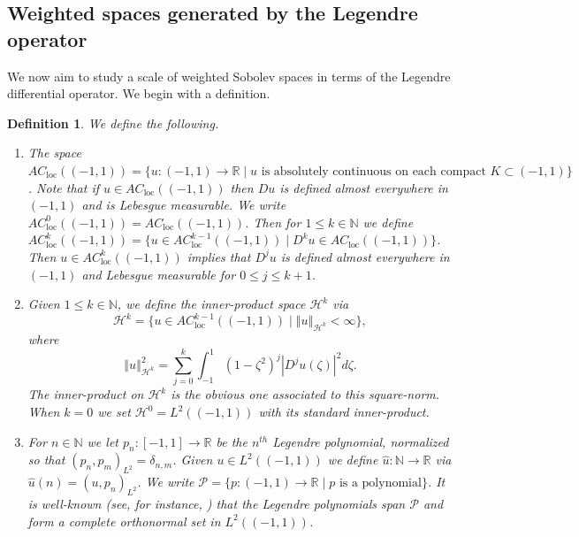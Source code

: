 \documentclass[11pt,reqno]{amsart}
\numberwithin{equation}{section}
\providecommand{\abs}[1]{\left\vert#1\right\vert}
\providecommand{\norm}[1]{\left\Vert#1\right\Vert}
\providecommand{\ip}[1]{\left(#1 \right)}
\providecommand{\abs}[1]{\left\vert#1\right\vert}
\providecommand{\norm}[1]{\left\Vert#1\right\Vert}
\newcommand{\m}{\mathrm}
\def\h{\mathcal{H}}
\def\N{\mathbb{N}}
\def\R{\mathbb{R}}
\def\acl{AC_{\m{loc}}}
\def\st{\;\vert\;}
\newtheorem{dfn}[lem]{Definition}
\begin{document}
\subsection{Weighted spaces generated by the Legendre operator}

We now aim to study a scale of weighted Sobolev spaces in terms of the Legendre differential operator.  We begin with a definition.

\begin{dfn}
We define the following.
\begin{enumerate}
 \item The space $\acl((-1,1))  = \{u : (-1,1) \to \R \st u \text{ is absolutely continuous on each compact }K \subset (-1,1)\}$.  Note that if $u \in \acl((-1,1))$ then $Du$ is defined almost everywhere in $(-1,1)$ and is Lebesgue measurable.   We write  $\acl^0((-1,1)) =\acl((-1,1))$.  Then for $1 \le k \in \N$ we define $\acl^k((-1,1)) = \{u \in \acl^{k-1}((-1,1)) \st D^k u \in \acl((-1,1)) \}$.  Then $u \in \acl^k((-1,1))$ implies that $D^j u$ is defined almost everywhere in $(-1,1)$ and Lebesgue measurable for $0 \le j \le k+1$.  
 
 
 \item Given $1\le k \in \N$, we define the inner-product space $\h^k$ via
\begin{equation}\label{def:Hk}
 \h^k = \{u \in \acl^{k-1}((-1,1)) \st \norm{u}_{\h^k} < \infty \},
\end{equation}
where
\begin{equation}\label{def:Hk_norm}
 \norm{u}_{\h^k}^2 = \sum_{j=0}^k \int_{-1}^1 (1-\zeta^2)^j \abs{D^j u(\zeta)}^2 d\zeta.
\end{equation}
The inner-product on $\h^k$ is the obvious one associated to this square-norm.  When $k=0$ we set  $\h^0 = L^2((-1,1))$ with its standard inner-product.

 \item For $n \in \N$ we let $p_n : [-1,1] \to \R$ be the $n^{th}$ Legendre polynomial, normalized so that $\ip{p_n,p_m}_{L^2} = \delta_{n,m}$.  Given $u \in L^2((-1,1))$ we define $\hat{u} : \N \to \R$ via $\hat{u}(n) = \ip{u,p_n}_{L^2}$.  We write $\mathcal{P} = \{ p : (-1,1) \to \R \st p \text{ is a polynomial}\}$.  It is well-known (see, for instance, \cite{Sz_1978})  that the Legendre polynomials span $\mathcal{P}$ and form a complete orthonormal set in $L^2((-1,1))$. 
\end{enumerate}
\end{dfn}
\end{document}
